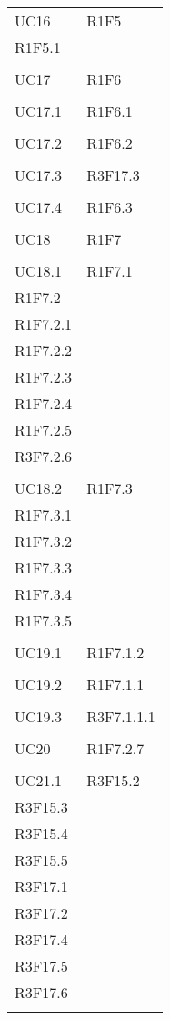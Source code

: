\begin{longtable}{ >{\centering}p{}
		>{\centering}p{}}
	UC16 & R1F5\\
	R1F5.1 \\\tabularnewline
	
	UC17 & R1F6\\
	\tabularnewline
	
	UC17.1 & R1F6.1\\
	\tabularnewline
	
	UC17.2 & R1F6.2\\
	\tabularnewline
	
	UC17.3 & R3F17.3\\
	\tabularnewline
	
	UC17.4 & R1F6.3\\
	\tabularnewline
	
	UC18 & R1F7\\
	\tabularnewline
	
	UC18.1 & R1F7.1\\
	R1F7.2 \\R1F7.2.1 \\R1F7.2.2 \\R1F7.2.3 \\R1F7.2.4 \\R1F7.2.5 \\R3F7.2.6 \\\tabularnewline
	
	UC18.2 & R1F7.3\\
	R1F7.3.1 \\R1F7.3.2 \\R1F7.3.3 \\R1F7.3.4 \\R1F7.3.5 \\\tabularnewline
	
	UC19.1 & R1F7.1.2\\
	\tabularnewline
	
	UC19.2 & R1F7.1.1\\
	\tabularnewline
	
	UC19.3 & R3F7.1.1.1\\
	\tabularnewline
	
	UC20 & R1F7.2.7\\
	\tabularnewline
	
	UC21.1 & R3F15.2\\
	R3F15.3 \\R3F15.4 \\R3F15.5 \\R3F17.1 \\R3F17.2 \\R3F17.4 \\R3F17.5 \\R3F17.6 \\\tabularnewline
	

\end{longtable}
